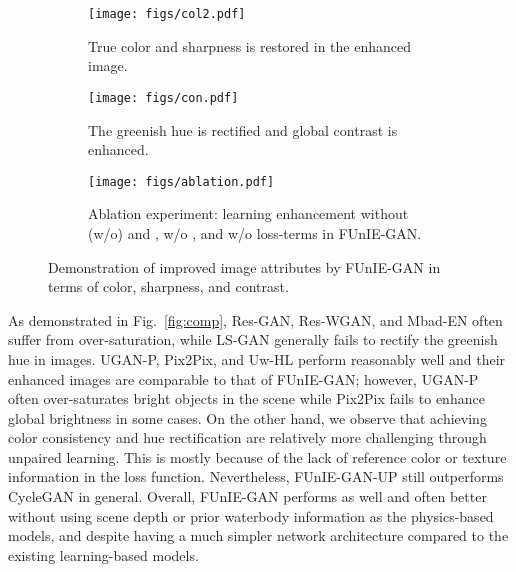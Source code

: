 \documentclass[10pt,twocolumn,letterpaper]{article}
\begin{document}
\begin{figure}
	\centering
	\begin{subfigure}{0.49\textwidth}
		\centering
		\texttt{[image: figs/col2.pdf]}\caption{True color and sharpness is restored in the enhanced image.}
		\label{fig:res2a}
	\end{subfigure}
	
	\vspace{1mm}
	\begin{subfigure}{0.49\textwidth}
		\centering
		\texttt{[image: figs/con.pdf]}\caption{The greenish hue is rectified and global contrast is enhanced.}
		\label{fig:res2b}
	\end{subfigure}
	
	\vspace{1mm}
	\begin{subfigure}{0.49\textwidth}
		\centering
		\texttt{[image: figs/ablation.pdf]}
		\caption{Ablation experiment: learning enhancement without (w/o)  and , w/o , and w/o  loss-terms in FUnIE-GAN.}
		\label{fig:res2c}
	\end{subfigure}
	
	\caption{Demonstration of improved image attributes by FUnIE-GAN in terms of color, sharpness, and contrast.}
	\vspace{-1mm}
	\label{fig:res1}
\end{figure}


As demonstrated in Fig.~\ref{fig:comp}, Res-GAN, Res-WGAN, and Mbad-EN often suffer from over-saturation, while LS-GAN generally fails to rectify the greenish hue in images. UGAN-P, Pix2Pix, and Uw-HL perform reasonably well and their enhanced images are comparable to that of FUnIE-GAN; however, UGAN-P often over-saturates bright objects in the scene while Pix2Pix fails to enhance global brightness in some cases. 
On the other hand, we observe that achieving color consistency and hue rectification are relatively more challenging through unpaired learning. This is mostly because of the lack of reference color or texture information in the loss function. Nevertheless, FUnIE-GAN-UP still outperforms CycleGAN in general.     
Overall, FUnIE-GAN performs as well and often better without using scene depth or prior waterbody information as the physics-based models, and despite having a much simpler network architecture compared to the existing learning-based models.
\end{document}
